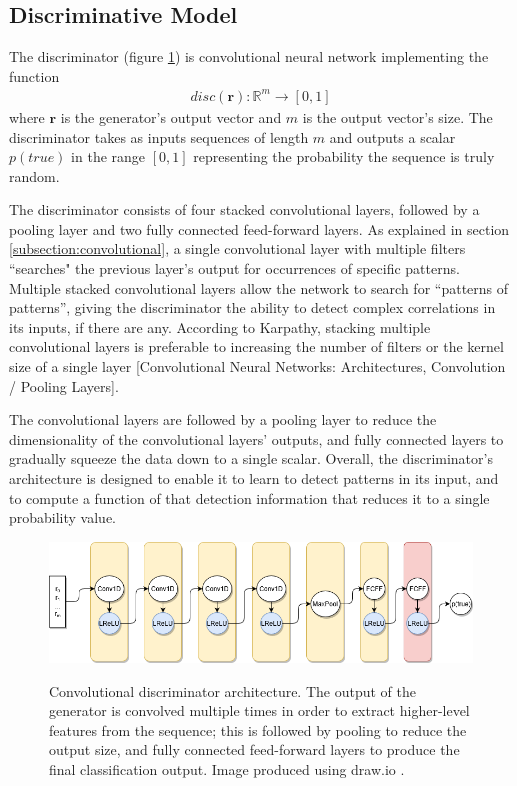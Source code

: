 \documentclass[12pt, titlepage]{report}
\theoremstyle{definition}
\begin{document}
\subsection{Discriminative Model}
The discriminator (figure \ref{figure:architecture_discriminator}) is convolutional neural network implementing the function
\begin{gather}
disc(\bm{r}) : \mathbb{R}^m \rightarrow [0, 1]
\end{gather}
where $\bm{r}$ is the generator's output vector and $m$ is the output vector's size. The discriminator takes as inputs sequences of length $m$ and outputs a scalar $p(true)$ in the range $[0, 1]$ representing the probability the sequence is truly random.

The discriminator consists of four stacked convolutional layers, followed by a pooling layer and two fully connected feed-forward layers. As explained in section \ref{subsection:convolutional}, a single convolutional layer with multiple filters ``searches" the previous layer's output for occurrences of specific patterns. Multiple stacked convolutional layers allow the network to search for ``patterns of patterns'', giving the discriminator the ability to detect complex correlations in its inputs, if there are any. According to Karpathy, stacking multiple convolutional layers is preferable to increasing the number of filters or the kernel size of a single layer [Convolutional Neural Networks: Architectures, Convolution / Pooling Layers]\cite{karpathy2017cs231n}.

The convolutional layers are followed by a pooling layer to reduce the dimensionality of the convolutional layers' outputs, and fully connected layers to gradually squeeze the data down to a single scalar. Overall, the discriminator's architecture is designed to enable it to learn to detect patterns in its input, and to compute a function of that detection information that reduces it to a single probability value.

\begin{figure}
\centering
\includegraphics[width=1\textwidth]{img/discriminator.png}\\
\caption[Discriminator architecture]{Convolutional discriminator architecture. The output of the generator is convolved multiple times in order to extract higher-level features from the sequence; this is followed by pooling to reduce the output size, and fully connected feed-forward layers to produce the final classification output. Image produced using draw.io \cite{jgraph2018draw}.}
\label{figure:architecture_discriminator}
\end{figure}
\end{document}

